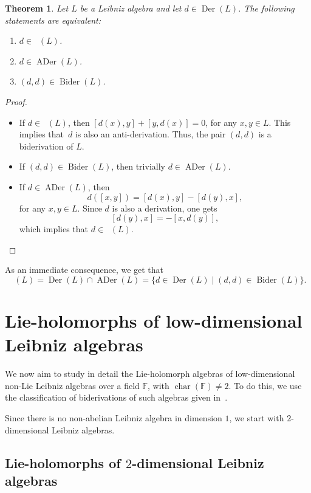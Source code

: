 \documentclass[11pt,a4paper]{amsart}
\theoremstyle{plain}
\newtheorem{theorem}[subsection]{Theorem}
\theoremstyle{definition}
\theoremstyle{remark}
\numberwithin{equation}{section}
\newenvironment{tfae}
{\renewcommand{\labelenumi}{(\roman{enumi})}
\begin{enumerate}}
{\end{enumerate}}
\newcommand{\0}{\emptyset}
\newcommand{\bF}{\mathbb{F}}
\DeclareMathOperator{\bchar}{char}
\DeclareMathOperator{\Der}{Der}
\DeclareMathOperator{\DerL}{Der_{Lie}}
\DeclareMathOperator{\ADer}{ADer}
\DeclareMathOperator{\Bider}{Bider}
\begin{document}
\begin{theorem}
Let $L$ be a Leibniz algebra and let $d \in \Der(L)$. The following statements are equivalent:
\begin{tfae}
\item  $d \in \DerL(L)$.
\item  $d \in \ADer(L)$.
\item $(d,d) \in \Bider(L)$.
\end{tfae}
\end{theorem}

\begin{proof}{\ }
\begin{itemize}
\item [(i)$\Rightarrow$(iii)] If $d \in \DerL(L)$, then $[d(x),y]+[y,d(x)]=0$, for any $x,y \in L$. This implies that~$d$ is also an anti-derivation. Thus, the pair $(d,d)$ is a biderivation of $L$.
\item[(iii)$\Rightarrow$(ii)] If $(d,d) \in \Bider(L)$, then trivially $d \in \ADer(L)$.
\item[(ii)$\Rightarrow$(i)] If $d \in \ADer(L)$, then
\[
d([x,y])=[d(x),y]-[d(y),x],
\]
for any $x,y \in L$. Since $d$ is also a derivation, one gets
\[
[d(y),x]=-[x,d(y)],
\]
 which implies that $d \in \DerL(L)$.
\end{itemize}    
\end{proof}

As an immediate consequence, we get that
\[
\DerL(L)=\Der(L) \cap \ADer(L) = \lbrace d \in \Der(L)\mid(d,d) \in \Bider(L) \rbrace.
\]

\section{Lie-holomorphs of low-dimensional Leibniz algebras}\label{sec:classification}

We now aim to study in detail the Lie-holomorph algebras of low-dimensional non-Lie Leibniz algebras over a field $\bF$, with $\bchar(\bF) \neq 2$. To do this, we use the classification of biderivations of such algebras given in~\cite{ManciniBider}.

Since there is no non-abelian Leibniz algebra in dimension $1$, we start with $2$-dimensional Leibniz algebras.

\subsection{Lie-holomorphs of $2$-dimensional Leibniz algebras}\label{2-dim}
\end{document}
